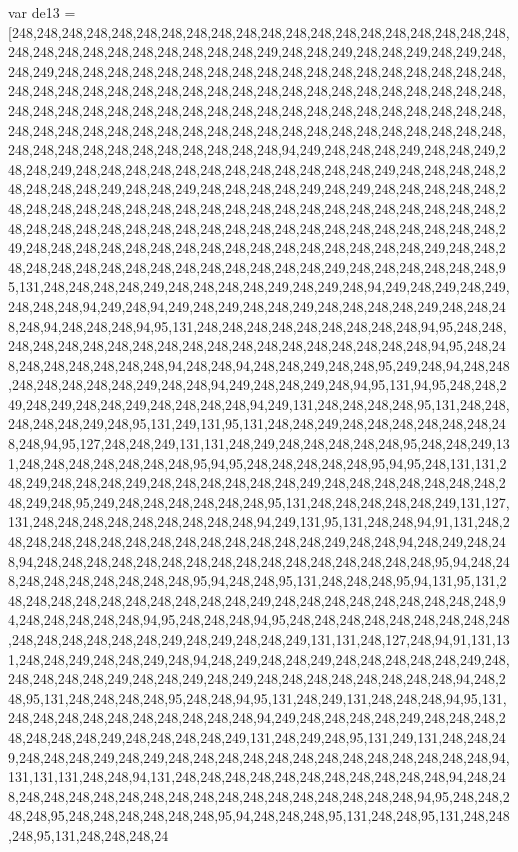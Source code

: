 var de13 = [248,248,248,248,248,248,248,248,248,248,248,248,248,248,248,248,248,248,248,248,248,248,248,248,248,248,248,248,248,248,249,248,248,249,248,248,249,248,249,248,248,249,248,248,248,248,248,248,248,248,248,248,248,248,248,248,248,248,248,248,248,248,248,248,248,248,248,248,248,248,248,248,248,248,248,248,248,248,248,248,248,248,248,248,248,248,248,248,248,248,248,248,248,248,248,248,248,248,248,248,248,248,248,248,248,248,248,248,248,248,248,248,248,248,248,248,248,248,248,248,248,248,248,248,248,248,248,248,248,248,248,94,249,248,248,248,249,248,248,249,248,248,249,248,248,248,248,248,248,248,248,248,248,248,248,249,248,248,248,248,248,248,248,248,249,248,248,249,248,248,248,248,249,248,249,248,248,248,248,248,248,248,248,248,248,248,248,248,248,248,248,248,248,248,248,248,248,248,248,248,248,248,248,248,248,248,248,248,248,248,248,248,248,248,248,248,248,248,248,248,249,248,248,248,248,248,248,248,248,248,248,248,248,248,248,248,248,249,248,248,248,248,248,248,248,248,248,248,248,248,248,248,248,249,248,248,248,248,248,248,95,131,248,248,248,248,249,248,248,248,248,249,248,249,248,94,249,248,249,248,249,248,248,248,94,249,248,94,249,248,249,248,248,249,248,248,248,248,249,248,248,248,248,94,248,248,248,94,95,131,248,248,248,248,248,248,248,248,248,94,95,248,248,248,248,248,248,248,248,248,248,248,248,248,248,248,248,248,248,248,94,95,248,248,248,248,248,248,248,248,94,248,248,94,248,248,249,248,248,95,249,248,94,248,248,248,248,248,248,248,249,248,248,94,249,248,248,249,248,94,95,131,94,95,248,248,249,248,249,248,248,249,248,248,248,248,94,249,131,248,248,248,248,95,131,248,248,248,248,248,249,248,95,131,249,131,95,131,248,248,249,248,248,248,248,248,248,248,248,94,95,127,248,248,249,131,131,248,249,248,248,248,248,248,95,248,248,249,131,248,248,248,248,248,248,248,95,94,95,248,248,248,248,248,95,94,95,248,131,131,248,249,248,248,248,249,248,248,248,248,248,248,249,248,248,248,248,248,248,248,248,249,248,95,249,248,248,248,248,248,248,95,131,248,248,248,248,248,249,131,127,131,248,248,248,248,248,248,248,248,248,94,249,131,95,131,248,248,94,91,131,248,248,248,248,248,248,248,248,248,248,248,248,248,248,249,248,248,94,248,249,248,248,94,248,248,248,248,248,248,248,248,248,248,248,248,248,248,248,248,95,94,248,248,248,248,248,248,248,248,248,95,94,248,248,95,131,248,248,248,95,94,131,95,131,248,248,248,248,248,248,248,248,248,248,249,248,248,248,248,248,248,248,248,248,94,248,248,248,248,248,94,95,248,248,248,94,95,248,248,248,248,248,248,248,248,248,248,248,248,248,248,248,249,248,249,248,248,249,131,131,248,127,248,94,91,131,131,248,248,249,248,248,249,248,94,248,249,248,248,249,248,248,248,248,248,249,248,248,248,248,248,249,248,248,249,248,249,248,248,248,248,248,248,248,248,94,248,248,95,131,248,248,248,248,95,248,248,94,95,131,248,249,131,248,248,248,94,95,131,248,248,248,248,248,248,248,248,248,248,94,249,248,248,248,248,249,248,248,248,248,248,248,248,249,248,248,248,248,249,131,248,249,248,95,131,249,131,248,248,249,248,248,248,249,248,249,248,248,248,248,248,248,248,248,248,248,248,248,248,94,131,131,131,248,248,94,131,248,248,248,248,248,248,248,248,248,248,248,94,248,248,248,248,248,248,248,248,248,248,248,248,248,248,248,248,248,248,94,95,248,248,248,248,95,248,248,248,248,248,248,95,94,248,248,248,95,131,248,248,95,131,248,248,248,95,131,248,248,248,24
